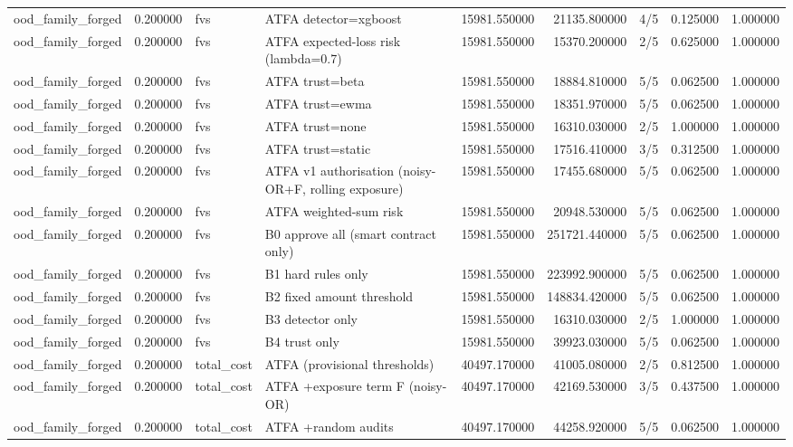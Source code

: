 \begin{tabular}{lrllrrlrr}
ood\_family\_forged & 0.200000 & fvs & ATFA detector=xgboost & 15981.550000 & 21135.800000 & 4/5 & 0.125000 & 1.000000 \\
ood\_family\_forged & 0.200000 & fvs & ATFA expected-loss risk (lambda=0.7) & 15981.550000 & 15370.200000 & 2/5 & 0.625000 & 1.000000 \\
ood\_family\_forged & 0.200000 & fvs & ATFA trust=beta & 15981.550000 & 18884.810000 & 5/5 & 0.062500 & 1.000000 \\
ood\_family\_forged & 0.200000 & fvs & ATFA trust=ewma & 15981.550000 & 18351.970000 & 5/5 & 0.062500 & 1.000000 \\
ood\_family\_forged & 0.200000 & fvs & ATFA trust=none & 15981.550000 & 16310.030000 & 2/5 & 1.000000 & 1.000000 \\
ood\_family\_forged & 0.200000 & fvs & ATFA trust=static & 15981.550000 & 17516.410000 & 3/5 & 0.312500 & 1.000000 \\
ood\_family\_forged & 0.200000 & fvs & ATFA v1 authorisation (noisy-OR+F, rolling exposure) & 15981.550000 & 17455.680000 & 5/5 & 0.062500 & 1.000000 \\
ood\_family\_forged & 0.200000 & fvs & ATFA weighted-sum risk & 15981.550000 & 20948.530000 & 5/5 & 0.062500 & 1.000000 \\
ood\_family\_forged & 0.200000 & fvs & B0 approve all (smart contract only) & 15981.550000 & 251721.440000 & 5/5 & 0.062500 & 1.000000 \\
ood\_family\_forged & 0.200000 & fvs & B1 hard rules only & 15981.550000 & 223992.900000 & 5/5 & 0.062500 & 1.000000 \\
ood\_family\_forged & 0.200000 & fvs & B2 fixed amount threshold & 15981.550000 & 148834.420000 & 5/5 & 0.062500 & 1.000000 \\
ood\_family\_forged & 0.200000 & fvs & B3 detector only & 15981.550000 & 16310.030000 & 2/5 & 1.000000 & 1.000000 \\
ood\_family\_forged & 0.200000 & fvs & B4 trust only & 15981.550000 & 39923.030000 & 5/5 & 0.062500 & 1.000000 \\
ood\_family\_forged & 0.200000 & total\_cost & ATFA (provisional thresholds) & 40497.170000 & 41005.080000 & 2/5 & 0.812500 & 1.000000 \\
ood\_family\_forged & 0.200000 & total\_cost & ATFA +exposure term F (noisy-OR) & 40497.170000 & 42169.530000 & 3/5 & 0.437500 & 1.000000 \\
ood\_family\_forged & 0.200000 & total\_cost & ATFA +random audits & 40497.170000 & 44258.920000 & 5/5 & 0.062500 & 1.000000 \\

\end{tabular}
